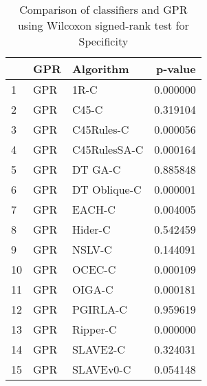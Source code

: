 \begin{table}
\footnotesize
\caption{Comparison of classifiers and GPR using Wilcoxon signed-rank test for Specificity}
\label{tab:GPR wilcoxon Specificity comparison}
\begin{tabular}{lllr}
\hline
 & GPR & Algorithm & p-value \\
\hline
1 & GPR & 1R-C & 0.000000 \\
2 & GPR & C45-C & 0.319104 \\
3 & GPR & C45Rules-C & 0.000056 \\
4 & GPR & C45RulesSA-C & 0.000164 \\
5 & GPR & DT GA-C & 0.885848 \\
6 & GPR & DT Oblique-C & 0.000001 \\
7 & GPR & EACH-C & 0.004005 \\
8 & GPR & Hider-C & 0.542459 \\
9 & GPR & NSLV-C & 0.144091 \\
10 & GPR & OCEC-C & 0.000109 \\
11 & GPR & OIGA-C & 0.000181 \\
12 & GPR & PGIRLA-C & 0.959619 \\
13 & GPR & Ripper-C & 0.000000 \\
14 & GPR & SLAVE2-C & 0.324031 \\
15 & GPR & SLAVEv0-C & 0.054148 \\
\hline
\end{tabular}
\end{table}

